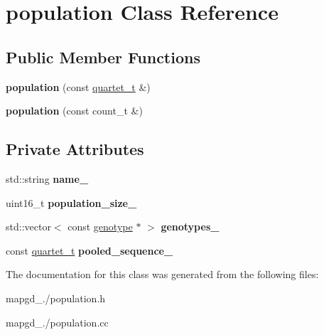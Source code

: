 \hypertarget{classpopulation}{\section{population Class Reference}
\label{classpopulation}
}
\subsection*{Public Member Functions}
\begin{DoxyCompactItemize}
\item 
\hypertarget{classpopulation_a566b82ba92ef99a0c19ed75aad5bc519}{{\bfseries population} (const \hyperlink{structquartet}{quartet\-\_\-t} \&)}\label{classpopulation_a566b82ba92ef99a0c19ed75aad5bc519}

\item 
\hypertarget{classpopulation_a3d2a3774545fdcb720200a369c15f74e}{{\bfseries population} (const count\-\_\-t \&)}\label{classpopulation_a3d2a3774545fdcb720200a369c15f74e}

\end{DoxyCompactItemize}
\subsection*{Private Attributes}
\begin{DoxyCompactItemize}
\item 
\hypertarget{classpopulation_a9d29ca129eb7f320f06443addf3c647a}{std\-::string {\bfseries name\-\_\-}}\label{classpopulation_a9d29ca129eb7f320f06443addf3c647a}

\item 
\hypertarget{classpopulation_a2bebc2c6ae47556776b8c192f08238a5}{uint16\-\_\-t {\bfseries population\-\_\-size\-\_\-}}\label{classpopulation_a2bebc2c6ae47556776b8c192f08238a5}

\item 
\hypertarget{classpopulation_a499a3595f6b631d92ce44a817b522d28}{std\-::vector$<$ const \hyperlink{classgenotype}{genotype} $\ast$ $>$ {\bfseries genotypes\-\_\-}}\label{classpopulation_a499a3595f6b631d92ce44a817b522d28}

\item 
\hypertarget{classpopulation_aa69d0cd5bb4c72944f16c6a3dd302315}{const \hyperlink{structquartet}{quartet\-\_\-t} {\bfseries pooled\-\_\-sequence\-\_\-}}\label{classpopulation_aa69d0cd5bb4c72944f16c6a3dd302315}

\end{DoxyCompactItemize}


The documentation for this class was generated from the following files\-:\begin{DoxyCompactItemize}
\item 
mapgd\-\_./population.\-h\item 
mapgd\-\_./population.\-cc\end{DoxyCompactItemize}
